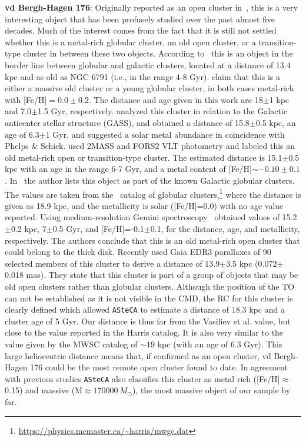 \documentclass[draft]{aa}
\begin{document}
\begin{appendix}
  \noindent \textbf{vd Bergh-Hagen 176}: Originally reported as an open cluster
  in~\cite{vandenBergh_1975}, this is a very interesting object that has been
  profusely studied over the past almost five decades. Much of the interest
  comes from the fact that it is still not settled whether this is a metal-rich
  globular cluster, an old open cluster, or a transition-type cluster in between
  these two objects.
  According to~\cite{Ortolani_1995} this is an object in the border line
  between globular and galactic clusters, located at a distance of 13.4 kpc
  and as old as NGC 6791 (i.e., in the range 4-8 Gyr).
  \cite{Phelps_2003} claim that this is a either a massive old cluster or a
  young globular cluster, in both cases metal-rich with [Fe/H]$=0.0\pm0.2$.
  The distance and age given in this work are 18$\pm$1 kpc and 7.0$\pm$1.5 Gyr,
  respectively.
  \cite{Frinchaboy_2006} analyzed this cluster in relation to the Galactic
  anticenter stellar structure (GASS), and obtained a distance of 15.8$\pm$0.5
  kpc, an age of 6.3$\pm$1 Gyr, and suggested a solar metal abundance in
  coincidence with Phelps \& Schick.
  \cite{Davoust_2011} used 2MASS and FORS2 VLT photometry and labeled this an
  old metal-rich open or transition-type cluster. The estimated  distance is
  15.1$\pm$0.5 kpc with an age in the range 6-7 Gyr, and a metal content of
  [Fe/H]$\sim-0.10\pm0.1$.
  In~\cite{vandenBergh_2011} the author lists this object as part of the known
  Galactic globular clusters. The values are taken from
  the~\cite{Harris_1996,Harris_2010} catalog of globular
  clusters,\footnote{\url{https://physics.mcmaster.ca/~harris/mwgc.dat}}
  where the distance is given as 18.9 kpc,
  and the metallicity is solar ([Fe/H]=0.0) with no age value reported.
  Using medium-resolution Gemini spectroscopy~\cite{Sharina_2014} obtained
  values of 15.2$\pm$0.2 kpc, 7$\pm$0.5 Gyr, and [Fe/H]=-0.1$\pm$0.1, for the
  distance, age, and metallicity, respectively. The authors conclude that this
  is an old metal-rich open cluster that could belong to the thick disk.
  Recently \cite{Vasiliev_2021} used Gaia EDR3 parallaxes of 90 selected
  members of this cluster to derive a distance of 13.9$\pm$3.5 kpc
  (0.072$\pm$0.018 mas). They state that this cluster is part of a group of
  objects that may be old open clusters rather than globular clusters.
  Although the position of the TO can not be established as it is not visible
  in the CMD, the RC for this cluster is clearly defined which allowed
  \texttt{ASteCA} to estimate a distance of 18.3 kpc and a cluster age of 5
  Gyr. Our distance is thus far from the Vasiliev et al. value, but close to the
  value reported in the Harris catalog. It is also very similar to the value
  given by the MWSC catalog of $\sim19$ kpc (with an age of 6.3 Gyr).
  This large heliocentric distance means that, if confirmed as an open
  cluster, vd Bergh-Hagen 176 could be the most remote open cluster found to
  date. In agreement with previous studies \texttt{ASteCA} also classifies this
  cluster as metal rich ([Fe/H]$\approx$0.15) and massive (M$\approx170000\,
  M_{\odot}$), the most massive object of our sample by far.\\


\end{appendix}
\end{document}
